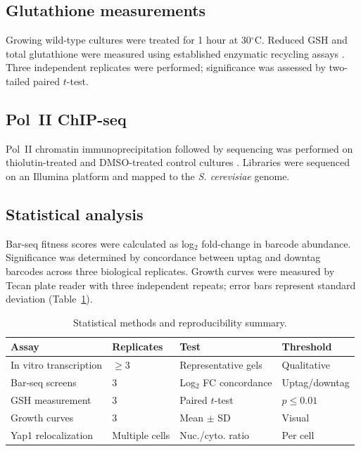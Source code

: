\documentclass[11pt,a4paper]{article}
\begin{document}
\subsection{Glutathione measurements}
Growing wild-type cultures were treated for 1 hour at 30$^\circ$C. Reduced GSH and total glutathione were measured using established enzymatic recycling assays \citep{Rahman2006}. Three independent replicates were performed; significance was assessed by two-tailed paired $t$-test.

\subsection{Pol~II ChIP-seq}
Pol~II chromatin immunoprecipitation followed by sequencing was performed on thiolutin-treated and DMSO-treated control cultures \citep{Rhee2011}. Libraries were sequenced on an Illumina platform and mapped to the \textit{S. cerevisiae} genome.

\subsection{Statistical analysis}
Bar-seq fitness scores were calculated as log$_2$ fold-change in barcode abundance. Significance was determined by concordance between uptag and downtag barcodes across three biological replicates. Growth curves were measured by Tecan plate reader with three independent repeats; error bars represent standard deviation (Table~\ref{tab:stats}).

\begin{table}[htbp]
\centering
\caption{Statistical methods and reproducibility summary.}
\label{tab:stats}
\small
\begin{tabular}{llll}
\toprule
\textbf{Assay} & \textbf{Replicates} & \textbf{Test} & \textbf{Threshold} \\
\midrule
In vitro transcription & $\geq$3 & Representative gels & Qualitative \\
Bar-seq screens & 3 & Log$_2$ FC concordance & Uptag/downtag \\
GSH measurement & 3 & Paired $t$-test & $p \leq 0.01$ \\
Growth curves & 3 & Mean $\pm$ SD & Visual \\
Yap1 relocalization & Multiple cells & Nuc./cyto. ratio & Per cell \\
\bottomrule
\end{tabular}
\end{table}
\end{document}
